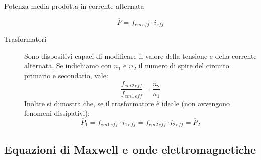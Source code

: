 \documentclass[a4paper,11pt,italian]{article}
\begin{document}
\begin{description}
  \item[Potenza media prodotta in corrente alternata] 
  \[ \overline{P} = f_{em \, \mathit{eff}} \cdot i_{\mathit{eff}} \]
  
  \item[Trasformatori] 
  Sono dispositivi capaci di modificare il valore della tensione e della corrente alternata. Se indichiamo con $ n_1 $ e $ n_2 $ il numero di spire del circuito primario e secondario, vale:
  \[ \frac{f_{em 2 \, \mathit{eff}}}{f_{em 1 \, \mathit{eff}}} = \frac{n_2}{n_1} \]
  Inoltre si dimostra che, se il trasformatore è ideale (non avvengono fenomeni dissipativi):
  \[ \overline{P}_1 = f_{em 1 \, \mathit{eff}} \cdot i_{1 \, \mathit{eff}} =  f_{em 2 \, \mathit{eff}} \cdot i_{2 \, \mathit{eff}} = \overline{P}_2 \]
\end{description}

\subsection{Equazioni di Maxwell e onde elettromagnetiche}
\end{document}
